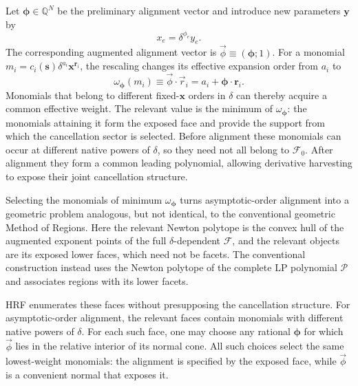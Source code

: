 \documentclass[a4paper,11pt]{article}
\newcommand{\x}{\boldsymbol{x}}
\newcommand{\s}{\boldsymbol{s}}
\begin{document}
Let \(\boldsymbol\phi\in\mathbb Q^N\) be the preliminary alignment vector and
introduce new parameters \(\boldsymbol y\) by
\begin{equation}
 x_e=\delta^{\phi_e}y_e.
 \label{eq:first-alignment-map}
\end{equation}
The corresponding augmented alignment vector is
\(\vec\phi\equiv(\boldsymbol\phi;1)\).
For a monomial
\(m_i=c_i(\s)\delta^{a_i}\x^{\boldsymbol r_i}\), the rescaling changes its
effective expansion order from \(a_i\) to
\begin{equation}
 \omega_{\boldsymbol\phi}(m_i)
 \equiv
 \vec\phi\cdot\vec r_i
 =a_i+\boldsymbol\phi\cdot\boldsymbol r_i.
 \label{eq:alignment-weight}
\end{equation}
Monomials that belong to different fixed-\(\x\) orders in \(\delta\) can
thereby acquire a common effective weight.  The relevant value is the minimum
of \(\omega_{\boldsymbol\phi}\): the monomials attaining it form the exposed
face and provide the support from which the cancellation sector is selected.
Before alignment these monomials can occur at different native powers of
\(\delta\), so they need not all belong to \(\mathcal F_0\).  After alignment
they form a common leading polynomial, allowing derivative harvesting to
expose their joint cancellation structure.

Selecting the monomials of minimum \(\omega_{\boldsymbol\phi}\) turns
asymptotic-order alignment into a geometric problem analogous, but not
identical, to the conventional geometric Method of Regions.  Here the
relevant Newton polytope is the convex hull of the augmented exponent points
of the full \(\delta\)-dependent \(\mathcal F\), and the relevant objects are
its exposed lower faces, which need not be facets.  The conventional
construction instead uses the Newton polytope of the complete LP polynomial
\(\mathcal P\) and associates regions with its lower facets.

HRF enumerates these faces without presupposing the cancellation structure.
For asymptotic-order alignment, the relevant faces contain monomials with
different native powers of \(\delta\).  For each such face, one may choose any
rational \(\boldsymbol\phi\) for which \(\vec\phi\) lies in the relative
interior of its normal cone.  All such choices select the same lowest-weight
monomials: the alignment is specified by the exposed face, while \(\vec\phi\)
is a convenient normal that exposes it.
\end{document}
